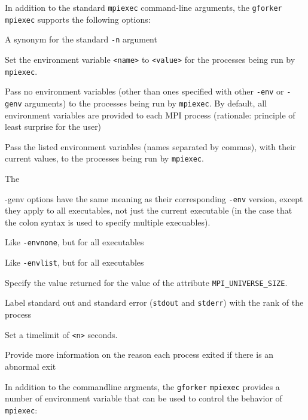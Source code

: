 \documentclass[dvipdfm,11pt]{article}
\begin{document}
In addition to the standard \texttt{mpiexec} command-line arguments, the
\texttt{gforker} \texttt{mpiexec} supports the following options:
\begin{description}
\item[\texttt{-np <num>}]A synonym for the standard \texttt{-n} argument
\item[\texttt{-env <name> <value>}]Set the environment variable
\texttt{<name>} to \texttt{<value>} for the processes being run by
\texttt{mpiexec}.
\item[\texttt{-envnone}]Pass no environment variables (other than ones
specified with  other \texttt{-env} or \texttt{-genv} arguments) to the
processes being run by \texttt{mpiexec}. 
By default, all environment
variables are provided to each MPI process (rationale: principle of
least surprise for the user)
\item[\texttt{-envlist <list>}]Pass the listed environment variables (names
separated  by commas), with their current values, to the processes being run by
 \texttt{mpiexec}.
\item[\texttt{-genv <name> <value>}]The \item{-genv} options have the same
meaning as their corresponding \texttt{-env} version, except they apply to all
executables, not just the current executable (in the case that the colon
syntax is used to specify multiple execuables).
\item[\texttt{-genvnone}]Like \texttt{-envnone}, but for all executables
\item[\texttt{-genvlist <list>}]Like \texttt{-envlist}, but for all executables
\item[\texttt{-usize <n>}]Specify the value returned for the value of the
attribute \texttt{MPI\_UNIVERSE\_SIZE}.
\item[\texttt{-l}]Label standard out and standard error (\texttt{stdout} and \texttt{stderr}) with 
  the rank of the process
\item[\texttt{-maxtime <n>}]Set a timelimit of \texttt{<n>} seconds.
\item[\texttt{-exitinfo}]Provide more information on the reason each process
exited if there is an abnormal exit
\end{description}

In addition to the commandline argments, the \texttt{gforker} \texttt{mpiexec}
provides a number of environment variable that can be used to control the
behavior of \texttt{mpiexec}:
\end{document}
